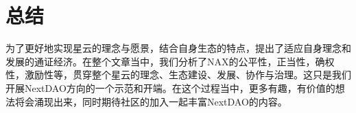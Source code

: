 \section{总结}
为了更好地实现星云的理念与愿景，结合自身生态的特点，提出了适应自身理念和发展的通证经济。在整个文章当中，我们分析了NAX的公平性，正当性，确权性，激励性等，贯穿整个星云的理念、生态建设、发展、协作与治理。这只是我们开展NextDAO方向的一个示范和开端。在这个过程当中，更多有趣，有价值的想法将会涌现出来，同时期待社区的加入一起丰富NextDAO的内容。
